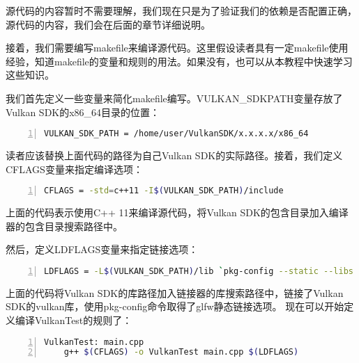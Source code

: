 \documentclass{ctexart}
\begin{document}
源代码的内容暂时不需要理解，我们现在只是为了验证我们的依赖是否配置正确，源代码的内容，我们会在后面的章节详细说明。

接着，我们需要编写makefile来编译源代码。这里假设读者具有一定makefile使用经验，知道makefile的变量和规则的用法。如果没有，也可以从本教程中快速学习这些知识。

我们首先定义一些变量来简化makefile编写。VULKAN\_SDKPATH变量存放了Vulkan SDK的x86\_64目录的位置：

\begin{lstlisting}[language={bash},keywordstyle=\color{blue!70},commentstyle=\color{red!50!green!50!blue!50},frame=shadowbox, rulesepcolor=\color{red!20!green!20!blue!20},basicstyle=\small,numbers=left, numberstyle=\tiny,breaklines=true]
VULKAN_SDK_PATH = /home/user/VulkanSDK/x.x.x.x/x86_64
\end{lstlisting}

读者应该替换上面代码的路径为自己Vulkan SDK的实际路径。接着，我们定义CFLAGS变量来指定编译选项：

\begin{lstlisting}[language={bash},keywordstyle=\color{blue!70},commentstyle=\color{red!50!green!50!blue!50},frame=shadowbox, rulesepcolor=\color{red!20!green!20!blue!20},basicstyle=\small,numbers=left, numberstyle=\tiny,breaklines=true]
CFLAGS = -std=c++11 -I$(VULKAN_SDK_PATH)/include
\end{lstlisting}

上面的代码表示使用C++ 11来编译源代码，将Vulkan SDK的包含目录加入编译器的包含目录搜索路径中。

然后，定义LDFLAGS变量来指定链接选项：

\begin{lstlisting}[language={bash},keywordstyle=\color{blue!70},commentstyle=\color{red!50!green!50!blue!50},frame=shadowbox, rulesepcolor=\color{red!20!green!20!blue!20},basicstyle=\small,numbers=left, numberstyle=\tiny,breaklines=true]
LDFLAGS = -L$(VULKAN_SDK_PATH)/lib `pkg-config --static --libs glfw3` -lvulkan
\end{lstlisting}

上面的代码将Vulkan SDK的库路径加入链接器的库搜索路径中，链接了Vulkan SDK的vulkan库，使用pkg-config命令取得了glfw静态链接选项。
现在可以开始定义编译VulkanTest的规则了：

\begin{lstlisting}[language={bash},keywordstyle=\color{blue!70},commentstyle=\color{red!50!green!50!blue!50},frame=shadowbox, rulesepcolor=\color{red!20!green!20!blue!20},basicstyle=\small,numbers=left, numberstyle=\tiny,breaklines=true]
VulkanTest: main.cpp
	g++ $(CFLAGS) -o VulkanTest main.cpp $(LDFLAGS)
\end{lstlisting}
\end{document}
